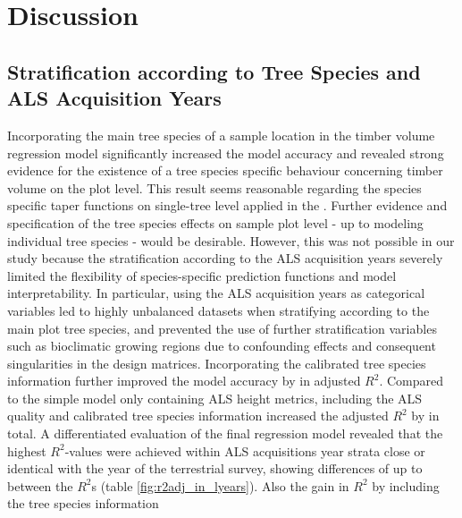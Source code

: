 \section{Discussion}
\label{sec:Dis}

\subsection{Stratification according to Tree Species and ALS Acquisition Years}
\label{sec:strat_dis}

Incorporating the main tree species of a sample location in the timber volume regression model significantly increased the model accuracy and revealed strong evidence for the existence of a tree species specific behaviour concerning timber volume on the plot level. This result seems reasonable regarding the species specific taper functions on single-tree level applied in the \bwi{} \citep{kublin2003, kublin2013}. Further evidence and specification of the tree species effects on sample plot level - up to modeling individual tree species - would be desirable. However, this was not possible in our study because the stratification according to the ALS acquisition years severely limited the flexibility of species-specific prediction functions and model interpretability. In particular, using the ALS acquisition years as categorical variables led to highly unbalanced datasets when stratifying according to the main plot tree species, and prevented the use of further stratification variables such as bioclimatic growing regions due to confounding effects and consequent singularities in the design matrices.  Incorporating the calibrated tree species information further improved the model accuracy by  in adjusted $R^2$. Compared to the simple model only containing ALS height metrics, including the ALS quality and calibrated tree species information increased the adjusted $R^2$ by  in total. A differentiated evaluation of the final regression model revealed that the highest $R^2$-values were achieved within ALS acquisitions year strata close or identical with the year of the terrestrial survey, showing differences of up to  between the $R^2$s (table \ref{fig:r2adj_in_lyears}). Also the gain in $R^2$ by including the tree species information 